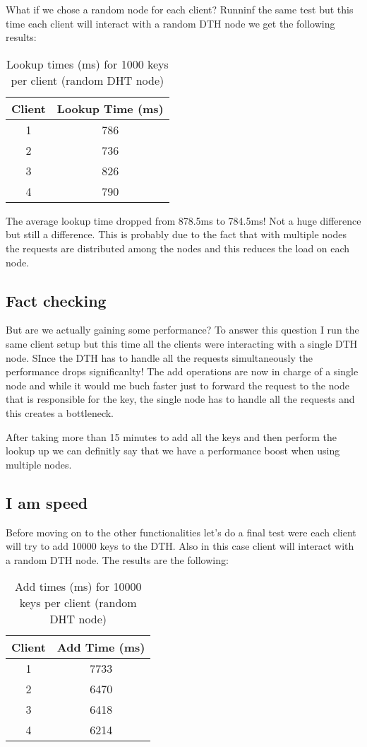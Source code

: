 \documentclass[a4paper, 11pt]{article}
\begin{document}
What if we chose a random node for each client? Runninf the same test but this time each client will interact with a random DTH node we get the following results:
\begin{table}[H]
\centering
\begin{tabular}{|c|c|}
\hline
\textbf{Client} & \textbf{Lookup Time (ms)} \\
\hline
1 & 786 \\
2 & 736 \\
3 & 826 \\
4 & 790 \\
\hline
\end{tabular}
\caption{Lookup times (ms) for 1000 keys per client (random DHT node)}
\end{table}

The average lookup time dropped from 878.5ms to 784.5ms! Not a huge difference but still a difference. This is probably due to the fact that with multiple nodes the requests are distributed among the nodes and this reduces the load on each node.

\subsection{Fact checking}
But are we actually gaining some performance? To answer this question I run the same client setup but this time all the clients were interacting with a single DTH node. SInce the DTH has to handle all the requests simultaneously the performance drops significanlty! The add operations are now in charge of a single node and while it would me buch faster just to forward the request to the node that is responsible for the key, the single node has to handle all the requests and this creates a bottleneck.

After taking more than 15 minutes to add all the keys and then perform the lookup up we can definitly say that we have a performance boost when using multiple nodes.

\subsection{I am speed}
Before moving on to the other functionalities let's do a final test were each client will try to add 10000 keys to the DTH. Also in this case client will interact with a random DTH node. The results are the following:
\begin{table}[H]
\centering
\begin{tabular}{|c|c|}
\hline
\textbf{Client} & \textbf{Add Time (ms)} \\
\hline
1 & 7733 \\
2 & 6470 \\
3 & 6418 \\
4 & 6214 \\
\hline
\end{tabular}
\caption{Add times (ms) for 10000 keys per client (random DHT node)}
\end{table}
\end{document}

